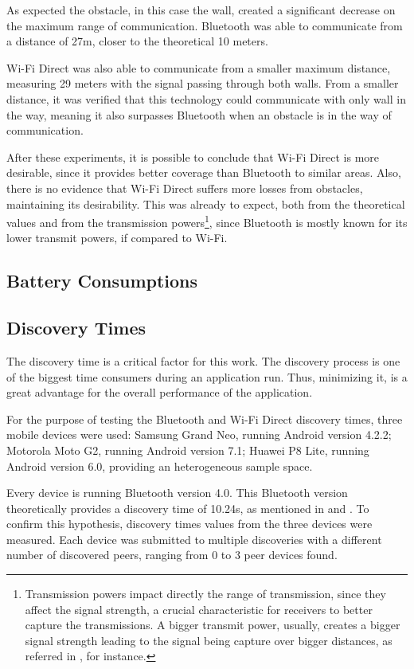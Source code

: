 As expected the obstacle, in this case the wall, created a significant decrease on the maximum range of communication. Bluetooth was able to communicate from a distance of 27m, closer to the theoretical 10 meters.

Wi-Fi Direct was also able to communicate from a smaller maximum distance, measuring 29 meters with the signal passing through both walls. From a smaller distance, it was verified that this technology could communicate with only wall in the way, meaning it also surpasses Bluetooth when an obstacle is in the way of communication.

After these experiments, it is possible to conclude that Wi-Fi Direct is more desirable, since it provides better coverage than Bluetooth to similar areas. Also, there is no evidence that Wi-Fi Direct suffers more losses from obstacles, maintaining its desirability. This was already to expect, both from the theoretical values and from the transmission powers\footnote{Transmission powers impact directly the range of transmission, since they affect the signal strength, a crucial characteristic for receivers to better capture the transmissions. A bigger transmit power, usually, creates a bigger signal strength leading to the signal being capture over bigger distances, as referred in \cite{txpower}, for instance.}, since Bluetooth is mostly known for its lower transmit powers, if compared to Wi-Fi.

\subsection{Battery Consumptions}

\subsection{Discovery Times}
\label{subsec:normaldisc}

The discovery time is a critical factor for this work. The discovery process is one of the biggest time consumers during an application run. Thus, minimizing it, is a great advantage for the overall performance of the application.

For the purpose of testing the Bluetooth and Wi-Fi Direct discovery times, three mobile devices were used: Samsung Grand Neo, running Android version 4.2.2; Motorola Moto G2, running Android version 7.1; Huawei P8 Lite, running Android version 6.0, providing an heterogeneous sample space.

Every device is running Bluetooth version 4.0. This Bluetooth version theoretically provides a discovery time of 10.24s, as mentioned in \cite{btdisc1} and \cite{btdisc2}. To confirm this hypothesis, discovery times values from the three devices were measured. Each device was submitted to multiple discoveries with a different number of discovered peers, ranging from 0 to 3 peer devices found.

